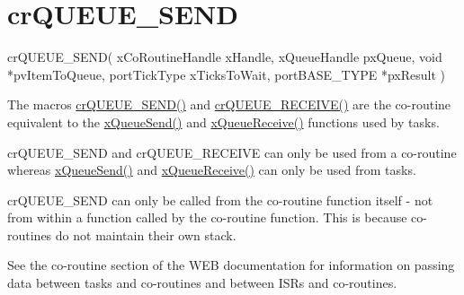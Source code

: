 \hypertarget{group__crQUEUE__SEND}{}\section{cr\+Q\+U\+E\+U\+E\+\_\+\+S\+E\+ND}
\label{group__crQUEUE__SEND}

\begin{DoxyPre}
crQUEUE\_SEND(
                 xCoRoutineHandle xHandle,
                 xQueueHandle pxQueue,
                 void *pvItemToQueue,
                 portTickType xTicksToWait,
                 portBASE\_TYPE *pxResult
            )\end{DoxyPre}


The macro\textquotesingle{}s \hyperlink{croutine_8h_a26af3d36f22a04168eebdf5b08465d6e}{cr\+Q\+U\+E\+U\+E\+\_\+\+S\+E\+N\+D()} and \hyperlink{croutine_8h_a586d57fd9a3e2aa5ae66484ed3be36c9}{cr\+Q\+U\+E\+U\+E\+\_\+\+R\+E\+C\+E\+I\+V\+E()} are the co-\/routine equivalent to the \hyperlink{queue_8h_af7eb49d3249351176992950d9185abe9}{x\+Queue\+Send()} and \hyperlink{queue_8h_af1549eac0e7f05694a59a0b967c80be3}{x\+Queue\+Receive()} functions used by tasks.

cr\+Q\+U\+E\+U\+E\+\_\+\+S\+E\+ND and cr\+Q\+U\+E\+U\+E\+\_\+\+R\+E\+C\+E\+I\+VE can only be used from a co-\/routine whereas \hyperlink{queue_8h_af7eb49d3249351176992950d9185abe9}{x\+Queue\+Send()} and \hyperlink{queue_8h_af1549eac0e7f05694a59a0b967c80be3}{x\+Queue\+Receive()} can only be used from tasks.

cr\+Q\+U\+E\+U\+E\+\_\+\+S\+E\+ND can only be called from the co-\/routine function itself -\/ not from within a function called by the co-\/routine function. This is because co-\/routines do not maintain their own stack.

See the co-\/routine section of the W\+EB documentation for information on passing data between tasks and co-\/routines and between I\+SR\textquotesingle{}s and co-\/routines.


